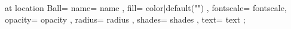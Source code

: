 \pic[shift={ {{- offset -}} }] at {{ location }} {
    Ball={
        name={{ name }},
        fill={{ color|default("\SumColor") }},
        fontscale={{ fontscale}},
        opacity={{ opacity }},
        radius={{ radius }},
        shades={{ shades }},
        text={{ text }}
    }
};

